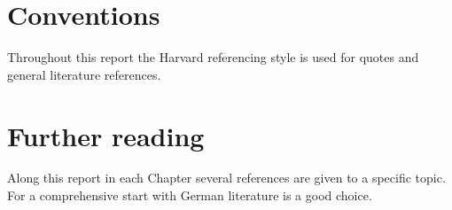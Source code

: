 \section{Conventions}

Throughout this report the Harvard referencing style is used for quotes and general
literature references. 

\section{Further reading}
Along this report in each Chapter several references are given to a specific topic. For a comprehensive start with German literature \citep{Laurien2009} is a good choice.